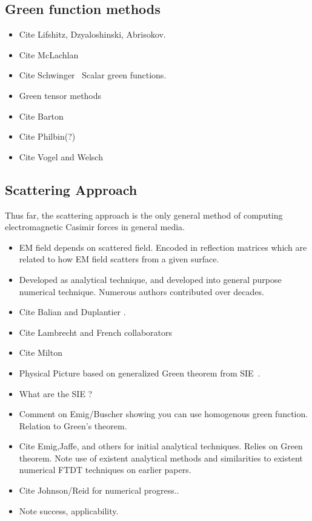 \subsection{Green function methods}

\begin{itemize}
\item Cite Lifshitz, Dzyaloshinski, Abrisokov.
\item Cite McLachlan~\cite{McLachlan1963}
\item Cite Schwinger~\cite{Schwinger1978, Milton1978}  Scalar green functions.  
\item Green tensor methods
\item Cite Barton
\item Cite Philbin(?)
\item Cite Vogel and Welsch
\end{itemize}

\subsection{Scattering Approach}

Thus far, the scattering approach is the only general method of computing 
electromagnetic Casimir forces in general media.  
\begin{itemize}
\item EM field depends on scattered field.  Encoded in reflection matrices
which are related to how EM field scatters from a given surface.  
\item Developed as analytical technique, and developed into general purpose numerical technique.
Numerous authors contributed over decades.
\end{itemize}

\begin{itemize}
\item Cite Balian and Duplantier \cite{Balian1977, Balian1978}.
\item Cite Lambrecht and French collaborators
  \cite{Lambrecht2006, MaiaNeto2008,Canaguier-Durand2012}
\item Cite Milton
\item Physical Picture based on generalized Green theorem from 
  SIE~\cite{Stratton1941}.
\item What are the SIE ?  
\item Comment on Emig/Buscher showing you can use homogenous green function.
  Relation to Green's theorem.
\item Cite Emig,Jaffe,  and others for initial analytical techniques.  Relies on Green theorem.
\cite{Emig2004, Emig2007, Rahi2009}
\cite{Kenneth2006}
  Note use of existent analytical methods and similarities to existent 
  numerical FTDT techniques on earlier papers.  
  \cite{Rodriguez2007,Rodriguez2007a, Rodriguez2009}
\item Cite Johnson/Reid for numerical progress.\cite{Reid2009,Reid2011, Reid2013}.
\item Note success, applicability.  
\end{itemize}

